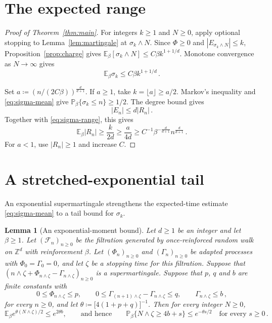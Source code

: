 \documentclass[11pt]{amsart}
\theoremstyle{plain}
\newtheorem{lemma}[theorem]{Lemma}
\theoremstyle{definition}
\newcommand{\Z}{\mathbb Z}
\renewcommand{\P}{\mathbb P}
\newcommand{\E}{\mathbb E}
\begin{document}
	\section{The expected range}\label{sec:range}
	\begin{proof}[Proof of Theorem~\ref{thm:main}]
		For integers $k\geq1$ and $N\geq0$, apply optional stopping to
		Lemma~\ref{lem:martingale} at $\sigma_k\wedge N$.  Since $\Phi\geq0$ and
		$|E_{\sigma_k\wedge N}|\leq k$, Proposition~\ref{prop:charge} gives
		$\E_\beta[\sigma_k\wedge N]\leq C\beta k^{1+1/d}$.
		Monotone convergence as $N\to\infty$ gives
		\begin{equation}\label{eq:sigma-mean}
			\E_\beta\sigma_k\leq C\beta k^{1+1/d}\, .
		\end{equation}

		Set $a\coloneqq(n/(2C\beta))^{\frac{d}{d+1}}$.
		If $a\geq1$, take $k=\lfloor a\rfloor\geq a/2$.
		Markov's inequality and \eqref{eq:sigma-mean} give
		$\P_\beta\{\sigma_k\leq n\}\geq1/2$.
		The degree bound gives
		\begin{equation}\label{eq:edges-sites}
			|E_n|\leq d|R_n|\, .
		\end{equation}
		Together with \eqref{eq:sigma-range}, this gives
		\[
		\E_\beta|R_n|\geq\frac{k}{2d}\geq\frac a{4d}
		\geq C^{-1}\beta^{-\frac{d}{d+1}}n^{\frac{d}{d+1}}\, .
		\]
		For $a<1$, use $|R_n|\geq1$ and increase $C$.
	\end{proof}

	\section{A stretched-exponential tail}\label{sec:tail}

	An exponential supermartingale strengthens the expected-time estimate
	\eqref{eq:sigma-mean} to a tail bound for $\sigma_k$.

	\begin{lemma}[An exponential-moment bound]\label{lem:exp}
		Let $d\geq1$ be an integer and let $\beta\geq1$.  Let
		$(\mathcal F_n)_{n\geq0}$ be the filtration generated by once-reinforced
		random walk on $\Z^d$ with reinforcement $\beta$.  Let $(\Phi_n)_{n\geq0}$ and
		$(\Gamma_n)_{n\geq0}$ be adapted processes with $\Phi_0=\Gamma_0=0$, and let
		$\zeta$ be a stopping time for this filtration.  Suppose that
		$(n\wedge\zeta+\Phi_{n\wedge\zeta}-\Gamma_{n\wedge\zeta})_{n\geq0}$ is a
		supermartingale.
		Suppose that $p$, $q$ and $b$ are finite constants with
		\[
			0\leq\Phi_{n\wedge\zeta}\leq p,
			\qquad
			0\leq\Gamma_{(n+1)\wedge\zeta}-\Gamma_{n\wedge\zeta}\leq q,
			\qquad
			\Gamma_{n\wedge\zeta}\leq b\, ,
		\]
		for every $n\geq0$, and let
		$\theta\coloneqq\bigl[4(1+p+q)\bigr]^{-1}$.  Then for every integer $N\geq0$,
		\[
			\E_\beta e^{\theta(N\wedge\zeta)/2}\leq e^{2\theta b},
			\qquad\text{and hence}\qquad
			\P_\beta\{N\wedge\zeta\geq4b+s\}\leq e^{-\theta s/2}
			\quad\text{for every }s\geq0\, .
		\]
	\end{lemma}
\end{document}
